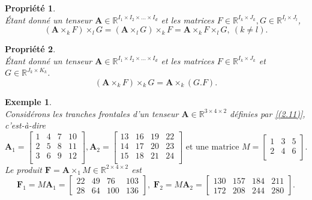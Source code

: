 \documentclass[11pt,a4paper,oneside]{book}
\newtheorem{propp}{Propriété}[chapter]
\newtheorem{ex}{Exemple}[chapter]}
\def\R{\mathbb R}
\newcommand{\mbf}[1]{\mathbf{#1}}
\begin{document}
\begin{propp}
\emph{\\}
Étant donné un tenseur $\mathbf{A} \in \R^{I_1 \times I_2\times \ldots \times I_{d}}$ et les matrices $F \in \R^{I_k \times J_k}, G \in \R^{I_l \times J_l}$,\begin{equation}
(\mathbf{A}\times_k F)\times_l G = (\mathbf{A}\times_l G)\times_k F = \mathbf{A}\times_k F \times_l G, \:(k\neq l).
\end{equation}
\end{propp}
\begin{propp}
\emph{\\}
Étant donné un tenseur $\mathbf{A} \in \R^{I_1 \times I_2\times \ldots \times I_{d}}$ et les matrices $F \in \R^{I_k \times J_k}$ et $ G \in \R^{J_k \times K_k}$.
\begin{equation}
(\mathbf{A}\times_k F)\times_k G = \mathbf{A}\times_k(G.F).
\end{equation}
\end{propp}
\begin{ex}
\emph{\\}
Considérons les tranches frontales d'un tenseur $ \mbf{A}\in\R^{3\times 4\times2} $ définies par \eqref{(2.11)}, c'est-à-dire\begin{equation*}
\mbf{A}_{1}=\begin{bmatrix}
1&4&7&10\\ 2&5&8&11\\3&6&9&12\\
\end{bmatrix}, \mbf{A}_{2}=\begin{bmatrix}
13&16&19&22\\
14&17&20&23\\
15&18&21&24\\
\end{bmatrix}\text{ et une matrice  }M=\begin{bmatrix}
1&3&5\\2&4&6\\
\end{bmatrix}.
\end{equation*}
Le produit $ \mbf{F}=\mbf{A}\times_{1}M\in\R^{2\times 4\times 2} $ est
\begin{equation*}
\mbf{F}_{1}=M\mbf{A}_{1}=\begin{bmatrix}
22&49&76&103\\28&64&100&136
\end{bmatrix},\; \mbf{F}_{2}=M\mbf{A}_{2}=\begin{bmatrix}
130&157&184&211\\172&208&244&280
\end{bmatrix}.
\end{equation*}
\end{ex}
\end{document}
